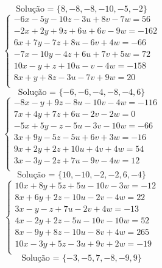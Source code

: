 \documentclass[12pt,oneside,a4paper]{article}
\begin{document}
\begin{equation*}
\text{Solução = }\{8,-8,-8,-10,-5,-2\}
\end{equation*}
\vspace{\baselineskip}
\begin{equation*}
\begin{cases}
-6x-5y-10z-3u+8v-7w=56 \\
-2x+2y+9z+6u+6v-9w=-162 \\
6x+7y-7z+8u-6v+4w=-66 \\
-7x-10y-4z+6u+7v+5w=72 \\
10x-y+z+10u-v-4w=-158 \\
8x+y+8z-3u-7v+9w=20 \\
\end{cases}
\end{equation*}
\begin{equation*}
\text{Solução = }\{-6,-6,-4,-8,-4,6\}
\end{equation*}
\vspace{\baselineskip}
\begin{equation*}
\begin{cases}
-8x-y+9z-8u-10v-4w=-116 \\
7x+4y+7z+6u-2v-2w=0 \\
-5x+5y-z-5u-3v-10w=-66 \\
3x+9y-5z-5u+6v+3w=-16 \\
9x+2y+2z+10u+4v+4w=54 \\
3x-3y-2z+7u-9v-4w=12 \\
\end{cases}
\end{equation*}
\begin{equation*}
\text{Solução = }\{10,-10,-2,-2,6,-4\}
\end{equation*}
\vspace{\baselineskip}
\begin{equation*}
\begin{cases}
10x+8y+5z+5u-10v-3w=-12 \\
8x+6y+2z-10u-2v-4w=22 \\
3x-y-z+7u-2v+4w=-13 \\
4x-2y+2z-5u-10v-10w=52 \\
8x-9y+8z-10u-8v+4w=265 \\
10x-3y+5z-3u+9v+2w=-19 \\
\end{cases}
\end{equation*}
\begin{equation*}
\text{Solução = }\{-3,-5,7,-8,-9,9\}
\end{equation*}
\end{document}
